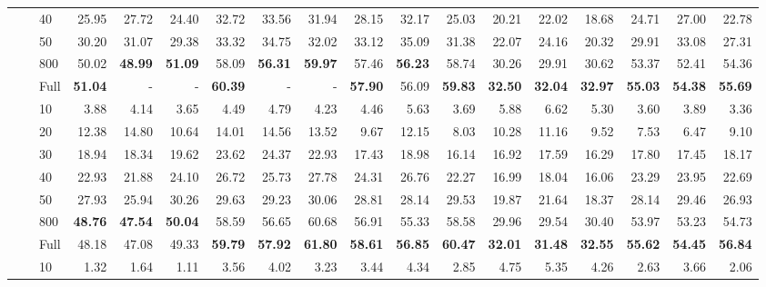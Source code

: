 \begin{table*}[!h]
{\begin{tabular}{lllrrr|rrr|rrr|rrr|rrr}
 \textbf{} & \textbf{} & 40 & 25.95 & 27.72 & 24.40 & 32.72 & 33.56 & 31.94 & 28.15 & 32.17 & 25.03 & 20.21 & 22.02 & 18.68 & 24.71 & 27.00 & 22.78 \\ 
 \textbf{} & \textbf{} & 50 & 30.20 & 31.07 & 29.38 & 33.32 & 34.75 & 32.02 & 33.12 & 35.09 & 31.38 & 22.07 & 24.16 & 20.32 & 29.91 & 33.08 & 27.31 \\ 
 \textbf{} & \textbf{} & 800 & 50.02 & \textbf{48.99} & \textbf{51.09} & 58.09 & \textbf{56.31} & \textbf{59.97} & 57.46 & \textbf{56.23} & 58.74 & 30.26 & 29.91 & 30.62 & 53.37 & 52.41 & 54.36 \\ 
 \textbf{} & \textbf{} & Full & \textbf{51.04} & - & - & \textbf{60.39} & - & - & \textbf{57.90} & 56.09 & \textbf{59.83} & \textbf{32.50} & \textbf{32.04} & \textbf{32.97} & \textbf{55.03} & \textbf{54.38} & \textbf{55.69} \\ 
\hline
\textbf{\multirow{7}{*}{DLO \citep{hu2022improving}}} & \textbf{} & 10 & 3.88 & 4.14 & 3.65 & 4.49 & 4.79 & 4.23 & 4.46 & 5.63 & 3.69 & 5.88 & 6.62 & 5.30 & 3.60 & 3.89 & 3.36 \\ 
 \textbf{} & \textbf{} & 20 & 12.38 & 14.80 & 10.64 & 14.01 & 14.56 & 13.52 & 9.67 & 12.15 & 8.03 & 10.28 & 11.16 & 9.52 & 7.53 & 6.47 & 9.10 \\ 
 \textbf{} & \textbf{} & 30 & 18.94 & 18.34 & 19.62 & 23.62 & 24.37 & 22.93 & 17.43 & 18.98 & 16.14 & 16.92 & 17.59 & 16.29 & 17.80 & 17.45 & 18.17 \\ 
 \textbf{} & \textbf{} & 40 & 22.93 & 21.88 & 24.10 & 26.72 & 25.73 & 27.78 & 24.31 & 26.76 & 22.27 & 16.99 & 18.04 & 16.06 & 23.29 & 23.95 & 22.69 \\ 
 \textbf{} & \textbf{} & 50 & 27.93 & 25.94 & 30.26 & 29.63 & 29.23 & 30.06 & 28.81 & 28.14 & 29.53 & 19.87 & 21.64 & 18.37 & 28.14 & 29.46 & 26.93 \\ 
 \textbf{} & \textbf{} & 800 & \textbf{48.76} & \textbf{47.54} & \textbf{50.04} & 58.59 & 56.65 & 60.68 & 56.91 & 55.33 & 58.58 & 29.96 & 29.54 & 30.40 & 53.97 & 53.23 & 54.73 \\ 
 \textbf{} & \textbf{} & Full & 48.18 & 47.08 & 49.33 & \textbf{59.79} & \textbf{57.92} & \textbf{61.80} & \textbf{58.61} & \textbf{56.85} & \textbf{60.47} & \textbf{32.01} & \textbf{31.48} & \textbf{32.55} & \textbf{55.62} & \textbf{54.45} & \textbf{56.84} \\ 
\hline
\textbf{\multirow{7}{*}{Paraphrase \citep{zhang2021aspect}}} & \textbf{} & 10 & 1.32 & 1.64 & 1.11 & 3.56 & 4.02 & 3.23 & 3.44 & 4.34 & 2.85 & 4.75 & 5.35 & 4.26 & 2.63 & 3.66 & 2.06 \\ 

\end{tabular}}
\end{table*}
